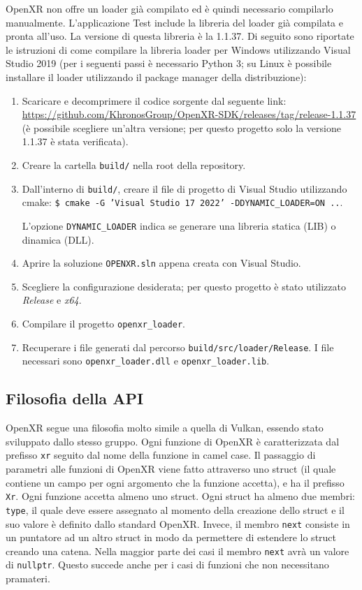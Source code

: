 \documentclass[twoside]{supsistudent}
\begin{document}
OpenXR non offre un loader già compilato ed è quindi necessario compilarlo manualmente. L'applicazione Test include la libreria del loader già compilata e pronta all'uso. La versione di questa libreria è la 1.1.37. Di seguito sono riportate le istruzioni di come compilare la libreria loader per Windows utilizzando Visual Studio 2019 (per i seguenti passi è necessario Python 3; su Linux è possibile installare il loader utilizzando il package manager della distribuzione):

\begin{enumerate}
  \item Scaricare e decomprimere il codice sorgente dal seguente link: \url{https://github.com/KhronosGroup/OpenXR-SDK/releases/tag/release-1.1.37} (è possibile scegliere un'altra versione; per questo progetto solo la versione 1.1.37 è stata verificata).
  \item Creare la cartella \texttt{build/} nella root della repository.
  \item Dall'interno di \texttt{build/}, creare il file di progetto di Visual Studio utilizzando cmake: \texttt{\$ cmake -G 'Visual Studio 17 2022' -DDYNAMIC\_LOADER=ON ..}.

  L'opzione \texttt{DYNAMIC\_LOADER} indica se generare una libreria statica (LIB) o dinamica (DLL).
  \item Aprire la soluzione \texttt{OPENXR.sln} appena creata con Visual Studio.
  \item Scegliere la configurazione desiderata; per questo progetto è stato utilizzato \textit{Release} e \textit{x64}.
  \item Compilare il progetto \texttt{openxr\_loader}.
  \item Recuperare i file generati dal percorso \texttt{build/src/loader/Release}. I file necessari sono \texttt{openxr\_loader.dll} e \texttt{openxr\_loader.lib}.
\end{enumerate}

\subsection{Filosofia della API}

OpenXR segue una filosofia molto simile a quella di Vulkan, essendo stato sviluppato dallo stesso gruppo. Ogni funzione di OpenXR è caratterizzata dal prefisso \texttt{xr} seguito dal nome della funzione in camel case. Il passaggio di parametri alle funzioni di OpenXR viene fatto attraverso uno struct (il quale contiene un campo per ogni argomento che la funzione accetta), e ha il prefisso \texttt{Xr}. Ogni funzione accetta almeno uno struct. Ogni struct ha almeno due membri: \texttt{type}, il quale deve essere assegnato al momento della creazione dello struct e il suo valore è definito dallo standard OpenXR. Invece, il membro \texttt{next} consiste in un puntatore ad un altro struct in modo da permettere di estendere lo struct creando una catena. Nella maggior parte dei casi il membro \texttt{next} avrà un valore di \texttt{nullptr}. Questo succede anche per i casi di funzioni che non necessitano pramateri.
\end{document}
